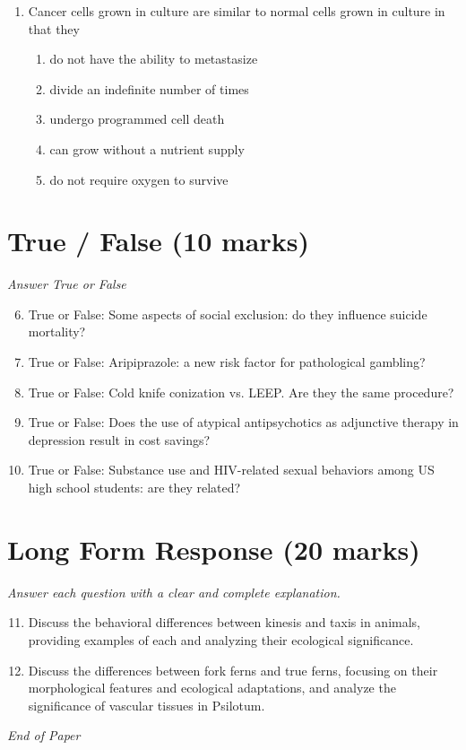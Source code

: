 \documentclass[12pt]{article}
\begin{document}
\begin{enumerate}[label=\arabic*.]
\begin{enumerate}[label=(\alph*)]
    \item 3/4
    \item 2/3
    \item 1/16
    \item 1/4
    \item 1/5
\end{enumerate}
\item Cancer cells grown in culture are similar to normal cells grown in culture in that they
\begin{enumerate}[label=(\alph*)]
    \item do not have the ability to metastasize
    \item divide an indefinite number of times
    \item undergo programmed cell death
    \item can grow without a nutrient supply
    \item do not require oxygen to survive
\end{enumerate}
\end{enumerate}

\section*{True / False (10 marks)}
\textit{Answer True or False}
\begin{enumerate}[label=\arabic*.]
\setcounter{enumi}{5}
\item True or False: Some aspects of social exclusion: do they influence suicide mortality?
\item True or False: Aripiprazole: a new risk factor for pathological gambling?
\item True or False: Cold knife conization vs. LEEP. Are they the same procedure?
\item True or False: Does the use of atypical antipsychotics as adjunctive therapy in depression result in cost savings?
\item True or False: Substance use and HIV-related sexual behaviors among US high school students: are they related?
\end{enumerate}

\section*{Long Form Response (20 marks)}
\textit{Answer each question with a clear and complete explanation.}
\begin{enumerate}[label=\arabic*.]
\setcounter{enumi}{10}
\item Discuss the behavioral differences between kinesis and taxis in animals, providing examples of each and analyzing their ecological significance.
\item Discuss the differences between fork ferns and true ferns, focusing on their morphological features and ecological adaptations, and analyze the significance of vascular tissues in Psilotum.
\end{enumerate}

\vfill
\noindent\textit{End of Paper}
\end{document}
